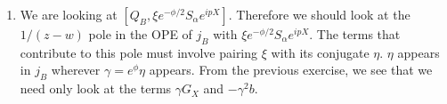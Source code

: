 \documentclass[11pt, class=article, crop=false]{standalone}
\begin{document}
\begin{enumerate}
\[\begin{aligned}
		\gamma G_{ghost} &= -c \left(-\frac12 (\d \phi)^2 + \frac12 \d^2 \phi + \frac12 (\d\chi)^2 + \frac12 \d^2 \chi\right) - \frac32 \d \phi\, \d c - 2 \gamma^2 b\\
		c T_{ghost} &= 2 b c \d c + c \left(-\frac12 (\d \phi)^2 - \d^2 \phi + \frac12 (\d\chi)^2 + \frac12 \d^2 \chi \right)
	\end{aligned}
	\]
	Altogether this gives a BRST current:
	\[
	\begin{aligned}
		j_B &= c T_X + \gamma G_X +  \frac12 \left(c T_{gh} + \gamma G_{gh} \right)\\
		&=  c T_X + \gamma G_X + b c \d c - \frac34 \d \phi \d c - \frac34 c \d^2 \phi - \gamma^2 b
	\end{aligned}
	\]
	\item We are looking at $[Q_B, \xi e^{-\phi/2} S_\alpha e^{i p X}]$. Therefore we should look at the $1/(z-w)$ pole in the OPE of $j_B$ with $\xi e^{-\phi/2} S_\alpha e^{i p X}$. The terms that contribute to this pole must involve pairing $\xi$ with its conjugate $\eta$. $\eta$ appears in $j_B$ wherever $\gamma = e^{\phi} \eta$ appears. From the previous exercise, we see that we need only look at the terms $\gamma G_X$ and $-\gamma^2 b$.
	

\end{enumerate}
\end{document}
